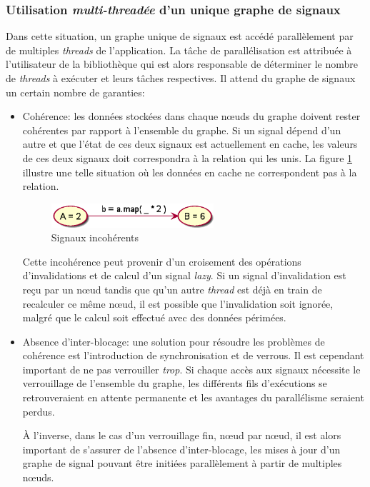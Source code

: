 \subsubsection{Utilisation \emph{multi-threadée} d'un unique graphe de signaux}

Dans cette situation, un graphe unique de signaux est accédé parallèlement par de multiples \emph{threads} de l'application. La tâche de parallélisation est attribuée à l'utilisateur de la bibliothèque qui est alors responsable de déterminer le nombre de \emph{threads} à exécuter et leurs tâches respectives. Il attend du graphe de signaux un certain nombre de garanties:
\begin{itemize}
	\item Cohérence: les données stockées dans chaque nœuds du graphe doivent rester cohérentes par rapport à l'ensemble du graphe. Si un signal dépend d'un autre et que l'état de ces deux signaux est actuellement en cache, les valeurs de ces deux signaux doit correspondra à la relation qui les unis. La figure \ref{fig:sig-inconsistency} illustre une telle situation où les données en cache ne correspondent pas à la relation.
	
	\begin{figure}
		\centering
		\includegraphics[width=6cm]{img/signals_coherence.eps}
		\caption{Signaux incohérents}
		\label{fig:sig-inconsistency}
	\end{figure}

	Cette incohérence peut provenir d'un croisement des opérations d'invalidations et de calcul d'un signal \emph{lazy}. Si un signal d'invalidation est reçu par un nœud tandis que qu'un autre \emph{thread} est déjà en train de recalculer ce même nœud, il est possible que l'invalidation soit ignorée, malgré que le calcul soit effectué avec des données périmées.
	
	\item Absence d'inter-blocage: une solution pour résoudre les problèmes de cohérence est l'introduction de synchronisation et de verrous. Il est cependant important de ne pas verrouiller \emph{trop}. Si chaque accès aux signaux nécessite le verrouillage de l'ensemble du graphe, les différents fils d'exécutions se retrouveraient en attente permanente et les avantages du parallélisme seraient perdus.
	
	À l'inverse, dans le cas d'un verrouillage fin, nœud par nœud, il est alors important de s'assurer de l'absence d'inter-blocage, les mises à jour d'un graphe de signal pouvant être initiées parallèlement à partir de multiples nœuds.
	

\end{itemize}
